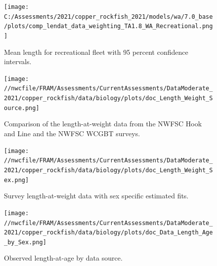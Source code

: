\documentclass[11pt,
  english,
  a4paper,
]{article}
\begin{document}
\tagmcend\tagstructend


\begin{figure}
\centering
\texttt{[image: C:/Assessments/2021/copper\_rockfish\_2021/models/wa/7.0\_base/plots/comp\_lendat\_data\_weighting\_TA1.8\_WA\_Recreational.png]}
\caption{Mean length for recreational fleet with 95 percent confidence intervals.\label{fig:mean-len-data}}
\end{figure}

\tagmcend\tagstructend


\begin{figure}
\centering
\texttt{[image: //nwcfile/FRAM/Assessments/CurrentAssessments/DataModerate\_2021/copper\_rockfish/data/biology/plots/doc\_Length\_Weight\_Source.png]}
\caption{Comparison of the length-at-weight data from the NWFSC Hook and Line and the NWFSC WCGBT surveys.\label{fig:len-weight-survey}}
\end{figure}

\tagmcend\tagstructend


\begin{figure}
\centering
\texttt{[image: //nwcfile/FRAM/Assessments/CurrentAssessments/DataModerate\_2021/copper\_rockfish/data/biology/plots/doc\_Length\_Weight\_Sex.png]}
\caption{Survey length-at-weight data with sex specific estimated fits.\label{fig:len-weight}}
\end{figure}

\tagmcend\tagstructend


\begin{figure}
\centering
\texttt{[image: //nwcfile/FRAM/Assessments/CurrentAssessments/DataModerate\_2021/copper\_rockfish/data/biology/plots/doc\_Data\_Length\_Age\_by\_Sex.png]}
\caption{Observed length-at-age by data source.\label{fig:len-age-data}}
\end{figure}

\tagmcend\tagstructend
\end{document}
